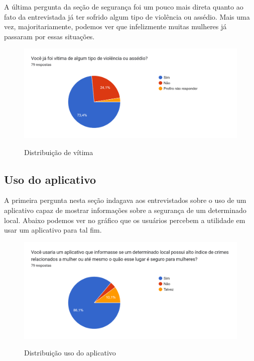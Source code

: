 A última pergunta da seção de segurança foi um pouco mais direta quanto ao fato da entrevistada já ter sofrido algum tipo de violência ou assédio. Mais uma vez, majoritariamente, podemos ver que infelizmente muitas mulheres já passaram por essas situações. 
\begin{figure}[H]
  \begin{center}
  \includegraphics[width=0.5\linewidth]{images/distribuicao-vitma.png}\\
  \end{center}
  \caption[Distribuição de vítima]{Distribuição de vítima}
  \label{fig:distribuicao-vitmal}
\end{figure}

\subsection{Uso do aplicativo}
A primeira pergunta nesta seção indagava aos entrevistados sobre o uso de um aplicativo capaz de mostrar informações sobre a segurança de um determinado local. Abaixo podemos ver no gráfico que os usuários percebem a utilidade em usar um aplicativo para tal fim.

\begin{figure}[h]
  \begin{center}
  \includegraphics[width=1.0\linewidth]{images/distribuicao-uso-aplicativo.png}\\
  \end{center}
  \caption[Distribuição uso do aplicativo]{Distribuição uso do aplicativo}
  \label{fig:distribuicao-uso-aplicativo}
\end{figure}

